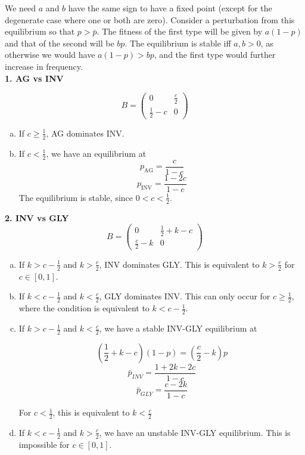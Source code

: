 \documentclass[12pt]{report}
\begin{document}
We need $a$ and $b$ have the same sign to have a fixed point (except for the degenerate case where one or both are zero). 
Consider a perturbation from this equilibrium so that $p > \bar{p}$. The fitness of the first type will be given by $a(1-p)$ and that of the second will be $bp$. The equilibrium is stable iff $a, b > 0$, as otherwise we would have $a(1-p) > bp$, and the first type would further increase in frequency. \\

\textbf{1. AG vs INV} 

$$B = \begin{pmatrix}
0 & \frac{c}{2}\\
\frac{1}{2} - c & 0 
\end{pmatrix} $$

\begin{enumerate}[(a)]
\item If  $c \ge \frac{1}{2}$, AG dominates INV.
\item If $c < \frac{1}{2}$, we have an equilibrium at 
$$p_{\text{AG}} = \frac{c}{1-c}$$
$$p_{\text{INV}} = \frac{1 - 2c}{1-c}$$
The equilibrium is stable, since $0 < c < \frac{1}{2}$. 
\end{enumerate}

\textbf{2. INV vs GLY}
$$B = \begin{pmatrix}
0 & \frac{1}{2} + k - c\\
\frac{c}{2} - k & 0 
\end{pmatrix} $$
\begin{enumerate}[(a)]
\item If $k > c - \frac{1}{2}$ and $k > \frac{c}{2}$,  INV dominates GLY. This is equivalent to $k > \frac{c}{2}$ for $c \in [0,1]$. 
\item If $k < c - \frac{1}{2}$ and $k < \frac{c}{2}$,  GLY dominates INV. This can only occur for $c \ge \frac{1}{2}$, where the condition is equivalent to $k < c - \frac{1}{2}$. 
\item  If $k > c - \frac{1}{2}$ and $k < \frac{c}{2}$, we have a stable INV-GLY equilibrium at 

$$(\frac{1}{2} + k - c) (1 - p) = (\frac{c}{2} - k) p$$
$$\bar{p}_{INV} = \frac{1 + 2k - 2c}{1 - c}$$
$$\bar{p}_{GLY} = \frac{c - 2k}{1-c}$$

For $c < \frac{1}{2}$, this is equivalent to $k < \frac{c}{2}$

\item  If $k < c - \frac{1}{2}$ and $k > \frac{c}{2}$, we have an unstable INV-GLY equilibrium. This is impossible for $c \in [0,1]$. 
\end{enumerate}
\end{document}
